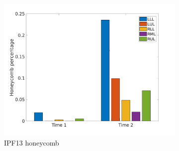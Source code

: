 \begin{figure}[H]
\begin{subfigure}{.46\linewidth}
  \includegraphics[width=\linewidth,trim={{.0\wd0} {.0\wd0} {.0\wd0} {.0\wd0}},clip]{Appendix/Image_AppexA/LobarDistribution/IPF13HoneycombLobarRegionDiseaseDistributionOverTime.jpg} %
  \caption{IPF13 honeycomb}
  \label{fig:IPF13LobarRegionDiseaseDistributionOverTime-c} 
\end{subfigure} 
\hspace{.3in}
\begin{subfigure}{.46\linewidth}%

\end{subfigure}
\end{figure}
